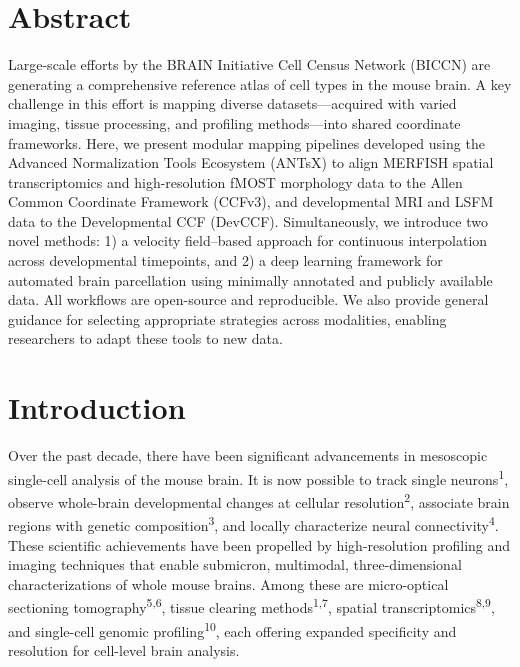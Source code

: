 \documentclass[
  12pt,
]{article}
\begin{document}
\normalsize

\newpage


\section*{Abstract}\label{abstract}

Large-scale efforts by the BRAIN Initiative Cell Census Network (BICCN)
are generating a comprehensive reference atlas of cell types in the
mouse brain. A key challenge in this effort is mapping diverse
datasets---acquired with varied imaging, tissue processing, and
profiling methods---into shared coordinate frameworks. Here, we present
modular mapping pipelines developed using the Advanced Normalization
Tools Ecosystem (ANTsX) to align MERFISH spatial transcriptomics and
high-resolution fMOST morphology data to the Allen Common Coordinate
Framework (CCFv3), and developmental MRI and LSFM data to the
Developmental CCF (DevCCF). Simultaneously, we introduce two novel
methods: 1) a velocity field--based approach for continuous
interpolation across developmental timepoints, and 2) a deep learning
framework for automated brain parcellation using minimally annotated and
publicly available data. All workflows are open-source and reproducible.
We also provide general guidance for selecting appropriate strategies
across modalities, enabling researchers to adapt these tools to new
data.

\clearpage

\section{Introduction}\label{introduction}

Over the past decade, there have been significant advancements in
mesoscopic single-cell analysis of the mouse brain. It is now possible
to track single neurons\textsuperscript{1}, observe whole-brain
developmental changes at cellular resolution\textsuperscript{2},
associate brain regions with genetic composition\textsuperscript{3}, and
locally characterize neural connectivity\textsuperscript{4}. These
scientific achievements have been propelled by high-resolution profiling
and imaging techniques that enable submicron, multimodal,
three-dimensional characterizations of whole mouse brains. Among these
are micro-optical sectioning tomography\textsuperscript{5,6}, tissue
clearing methods\textsuperscript{1,7}, spatial
transcriptomics\textsuperscript{8,9}, and single-cell genomic
profiling\textsuperscript{10}, each offering expanded specificity and
resolution for cell-level brain analysis.
\end{document}
